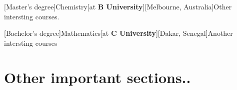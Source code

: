 \documentclass[a4paper]{arthur-cv}
\begin{document}
\begin{cvbody}
\begin{cvright}
\begin{rightenv}
          [Master's degree]{Chemistry}[at \textbf{B University}][Melbourne, Australia]{Other intersting courses.}

          [Bachelor's degree]{Mathematics}[at \textbf{C University}][Dakar, Senegal]{Another intersting courses}
        \end{rightenv}

      \section{Other important sections..}
        \begin{rightenv}

        \end{rightenv}


    \end{cvright}

  \end{cvbody}
\end{document}
